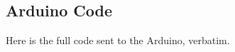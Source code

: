 
\begin{subappendices}
    \renewcommand{\thesection}{\Alph{section}}

    \section{Arduino Code}
    Here is the full code sent to the Arduino, verbatim.

    
\end{subappendices}